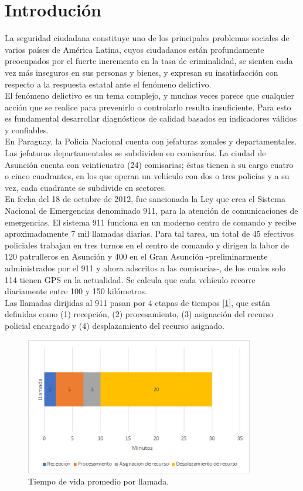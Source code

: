 \section{Introdución}
La seguridad ciudadana constituye uno de los principales problemas sociales de varios países de América Latina, cuyos ciudadanos están profundamente preocupados por el fuerte incremento en la tasa de criminalidad, se sienten cada vez más inseguros en sus personas y bienes, y expresan su insatisfacción con respecto a la respuesta estatal ante el fenómeno delictivo\cite{rico2002seguridad}.\\
El fenómeno delictivo es un tema complejo, y muchas veces parece que cualquier acción que se realice para prevenirlo o controlarlo resulta insuficiente. Para esto es fundamental desarrollar diagnósticos de calidad basados en indicadores válidos y confiables\cite{ensc2014}.\\
En Paraguay, la Policia Nacional cuenta con jefaturas zonales y departamentales. Las jefaturas departamentales se subdividen en comisarías. La ciudad de Asunción cuenta con veinticuatro (24) comisarias; éstas tienen a su cargo cuatro o cinco cuadrantes, en los que operan un vehículo con dos o tres policías y a su vez, cada cuadrante se subdivide en sectores\cite{ensc2014}. \\
En fecha del 18 de octubre de 2012, fue sancionada la Ley que crea el Sistema Nacional de Emergencias denominado 911, para la atención de comunicaciones de emergencias. El sistema 911 funciona en un moderno centro de comando y recibe aproximadamente 7 mil llamadas diarias. Para tal tarea, un total de 45 efectivos policiales trabajan en tres turnos en el centro de comando y dirigen la labor de 120 patrulleros en Asunción y 400 en el Gran Asunción -preliminarmente administrados por el 911 y ahora adscritos a las comisarías-, de los cuales solo 114 tienen GPS en la actualidad. Se calcula que cada vehículo recorre diariamente entre 100 y 150 kilómetros\cite{ensc2014}.\\
Las llamadas dirijidas al 911 pasan por 4 etapas de tiempos [\cref{fig:time1}], que están definidas como (1) recepción, (2) procesamiento, (3) asignación del recurso policial encargado y (4) desplazamiento del recurso asignado.
\begin{figure}[!h]
    \centering
    \includegraphics[width=100mm,scale=0.5]{images/tiempo_llamadas.png}
    \caption{Tiempo de vida promedio por llamada.}
    \label{fig:time1}
\end{figure}
